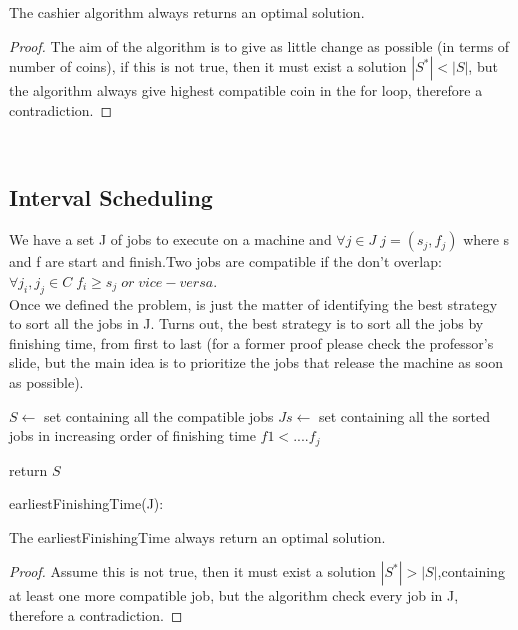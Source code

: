 \begin{claim}
    The cashier algorithm always returns an optimal solution.
\end{claim}
\begin{proof}
    The aim of the algorithm is to give as little change as possible (in terms of number of coins), if this is not true, then it must exist a solution $|S^{*}| < |S|$, but the algorithm always give highest compatible coin in the for loop, therefore a contradiction.
\end{proof}\

\subsection{Interval Scheduling}

We have a set J of jobs to execute on a machine and $\forall j \in J \; j=(s_{j},f_{j})$ where s and f are start and finish.Two jobs are compatible if the don't overlap: $\forall j_{i},j_{j} \in C \; f_{i} \geq s_{j} \; or \;vice-versa $.\\
Once we defined the problem, is just the matter of identifying the best strategy to sort all the jobs in J. Turns out, the best strategy is to sort all the jobs by finishing time, from first to last (for a former proof please check the professor's slide, but the main idea is to prioritize the jobs that release the machine as soon as possible).

\begin{algorithm}[H]
    \SetAlgoLined
    \small
    \BlankLine

    $S \leftarrow$ set containing all the compatible jobs\;
    $Js \leftarrow$ set containing all the sorted jobs in increasing order of finishing time $f1 < .... f_{j}$

    \BlankLine

    \BlankLine

    return $S$\;
    \caption{earliestFinishingTime(J):}
\end{algorithm}

\begin{claim}
    The earliestFinishingTime always return an optimal solution.
\end{claim}
\begin{proof}
    Assume this is not true, then it must exist a solution $|S^{*}| > |S|$,containing at least one more compatible job, but the algorithm check every job in J, therefore a contradiction.
\end{proof}\\

